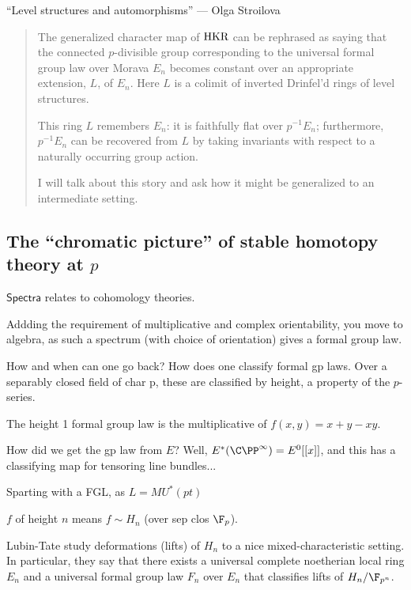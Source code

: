 \begin{OlgaLevelStructuresAndAutomorphisms}
\KanSemResponse
{``Level structures and automorphisms'' --- Olga Stroilova}
\begin{abstract}
The generalized character map of $\textup{HKR}$ can be rephrased as saying that the connected $p$-divisible group corresponding to the universal formal group law over Morava $E_n$ becomes constant over an appropriate extension, $L$, of $E_n$. Here $L$ is a colimit of inverted Drinfel'd rings of level structures.

This ring $L$ remembers $E_n$: it is faithfully flat over $p^{-1}E_n$; furthermore, $p^{-1} E_n$ can be recovered from $L$ by taking invariants with respect to a naturally occurring group action.

I will talk about this story and ask how it might be generalized to an intermediate setting.
\end{abstract}
\subsection*{The ``chromatic picture'' of stable homotopy theory at $p$}
$\mathsf{Spectra}$ relates to cohomology theories.

Addding the requirement of multiplicative and complex orientability, you move to algebra, as such a spectrum (with choice of orientation) gives a formal group law.

How and when can one go back? How does one classify formal gp laws. Over a separably closed field of char p, these are classified by height, a property of the $p$-series.

The height 1 formal group law is the multiplicative of $f(x,y)=x+y-xy$.

How did we get the gp law from $E$? Well, $E^*(\CP^\infty)=E^0[[x]]$, and this has a classifying map for tensoring line bundles...

Sparting with a FGL, as $L=MU^*(pt)$


$f$ of height $n$ means $f\sim H_n$ (over sep clos $\F_p$).

Lubin-Tate study deformations (lifts) of $H_n$ to a nice mixed-characteristic setting. In particular, they say that there exists a universal complete noetherian local ring $E_n$ and a universal formal group law $F_n$ over $E_n$ that classifies lifts of $H_n/\F_{p^n}$.


\pagebreak
\end{OlgaLevelStructuresAndAutomorphisms}






 










